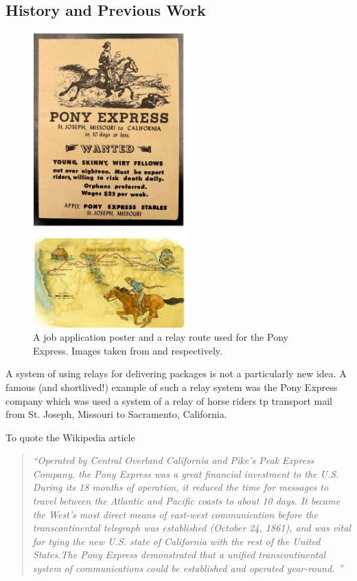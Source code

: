 \documentclass[12pt, english, oneside]{report}
\begin{document}
\newpage
\nocite{*}
\printbibliography
\begin{appendices}

\chapter{History and Previous Work}


\begin{figure}
  \begin{center}
      \includegraphics[width=6cm]{docs/pony-express.png}
      \caption{A job application poster and a relay route used for the Pony Express. 
      Images taken from \cite{orphans} and \cite{ponyroute} respectively.}
  \end{center}
\end{figure}

A system of using relays for delivering packages is not a particularly new idea. A 
famous (and shortlived!) example of such a relay system was the Pony Express company which 
was used a system of a relay of horse riders tp transport mail from St. Joseph, Missouri to 
Sacramento, California. 

To quote the Wikipedia article

\begin{quote}

\textit{``Operated by Central Overland California and Pike's Peak Express Company, the Pony Express was a great 
financial investment to the U.S. During its 18 months of operation, it reduced the time for messages to travel 
between the Atlantic and Pacific coasts to about 10 days. It became the West's most direct means of east-west 
communication before the transcontinental telegraph was established (October 24, 1861), and was vital for tying 
the new U.S. state of California with the rest of the United States.The Pony Express demonstrated that a unified 
transcontinental system of communications could be established and operated year-round. ''}
\end{quote}



\end{appendices}
\end{document}
